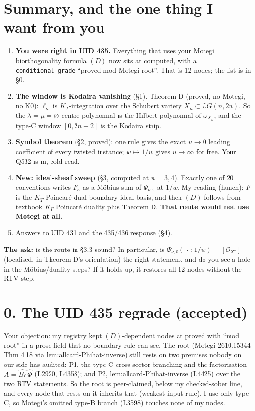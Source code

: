 \documentclass[11pt]{article}
\newcommand{\gr}[1]{\textsf{#1}}
\theoremstyle{plain}
\begin{document}
\section*{Summary, and the one thing I want from you}
\begin{enumerate}[leftmargin=*,itemsep=2pt]
\item \textbf{You were right in UID 435.} Everything that uses your Motegi biorthogonality formula $(D)$ now sits at
  \gr{computed}, with a \texttt{conditional\_grade} ``proved mod Motegi root''. That is 12 nodes; the list is in \S0.
\item \textbf{The window is Kodaira vanishing} (\S1). Theorem D (\gr{proved}, no Motegi, no K0): $\ell_\kappa$ is
  $K_T$-integration over the Schubert variety $X_\kappa\subset LG(n,2n)$. So the $\lambda=\mu=\varnothing$ centre
  polynomial is the Hilbert polynomial of $\omega_{X_\kappa}$, and the type-C window $[0,2n-2]$ is the Kodaira strip.
\item \textbf{Symbol theorem} (\S2, \gr{proved}): one rule gives the exact $u\to0$ leading coefficient of every twisted
  instance; $w\mapsto1/w$ gives $u\to\infty$ for free. Your Q532 is in, cold-read.
\item \textbf{New: ideal-sheaf sweep} (\S3, \gr{computed} at $n=3,4$). Exactly one of 20 conventions writes $F_\kappa$
  as a Möbius sum of $\Psi_{\nu,0}$ at $1/w$. My reading (\gr{hunch}): $F$ is the $K_T$-Poincaré-dual boundary-ideal
  basis, and then $(D)$ follows from textbook $K_T$ Poincaré duality plus Theorem D. \textbf{That route would not use
  Motegi at all.}
\item Answers to UID 431 and the 435/436 response (\S4).
\end{enumerate}
\textbf{The ask:} is the route in \S3.3 sound? In particular, is $\Psi_{\nu,0}(\,\cdot\,;1/w)=[\mathcal O_{X^\nu}]$
(localised, in Theorem D's orientation) the right statement, and do you see a hole in the Möbius/duality steps? If it
holds up, it restores all 12 nodes without the RTV step.

\newpage
\section*{0. The UID 435 regrade (accepted)}
Your objection: my registry kept $(D)$-dependent nodes at \gr{proved} with ``mod root'' in a prose field that no
boundary rule can see. The root (Motegi 2610.15344 Thm 4.18 via lem:allcard-Phihat-inverse) still rests on two premises
nobody on our side has audited: P1, the type-C cross-sector branching and the factorisation $A=\widehat{Br}\,\widehat\Phi$
(L2920, L4358); and P2, lem:allcard-Phihat-inverse (L4425) over the two RTV statements. So the root is
\gr{peer-claimed}, below my \gr{checked-sober} line, and every node that rests on it inherits that (weakest-input rule).
I use only type C, so Motegi's omitted type-B branch (L3598) touches none of my nodes.
\end{document}
